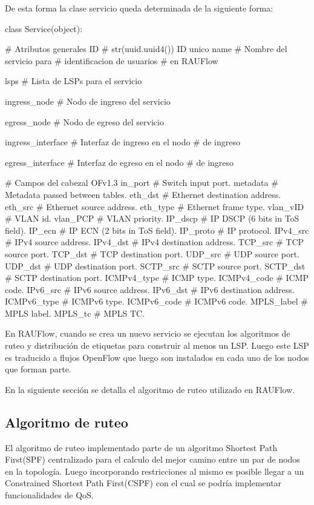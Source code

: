 De esta forma la clase servicio queda determinada de la siguiente forma:\\

\begin{python}
class Service(object):

		# Atributos generales
		ID 				    # str(uuid.uuid4()) ID unico  
		name 				# Nombre del servicio para 
							# identificacion de usuarios 
							# en RAUFlow
							
		lsps				# Lista de LSPs para el servicio
		
		ingress_node		# Nodo de ingreso del servicio
							
		egress_node 		# Nodo de egreso del servicio
							
		ingress_interface 	# Interfaz de ingreso en el nodo 
							# de ingreso
							
		egress_interface 	# Interfaz de egreso en el nodo 
							# de ingreso 
        
		# Campos del cabezal OFv1.3 
		in_port			# Switch input port. 
		metadata 		# Metadata passed between tables. 
		eth_dst 		# Ethernet destination address.
		eth_src 		# Ethernet source address. 
		eth_type 		# Ethernet frame type. 
		vlan_vID 		# VLAN id. 
		vlan_PCP		# VLAN priority. 
		IP_dscp 		# IP DSCP (6 bits in ToS field). 
		IP_ecn  		# IP ECN (2 bits in ToS field). 
		IP_proto		# IP protocol. 
		IPv4_src 		# IPv4 source address. 
		IPv4_dst 		# IPv4 destination address. 
		TCP_src 		# TCP source port. 
		TCP_dst 		# TCP destination port. 
		UDP_src 		# UDP source port. 
		UDP_dst 		# UDP destination port. 
		SCTP_src 		# SCTP source port. 
		SCTP_dst 		# SCTP destination port. 
		ICMPv4_type 	# ICMP type. 
		ICMPv4_code 	# ICMP code. 
		IPv6_src 		# IPv6 source address. 
		IPv6_dst 		# IPv6 destination address. 
		ICMPv6_type 	# ICMPv6 type. 
		ICMPv6_code 	# ICMPv6 code. 
		MPLS_label 		# MPLS label. 
		MPLS_tc 		# MPLS TC. 
		
\end{python}

En RAUFlow, cuando se crea un nuevo servicio se ejecutan los algoritmos de ruteo y distribución de etiquetas para construir al menos un LSP. Luego este LSP es traducido a flujos OpenFlow que luego son instalados en cada uno de los nodos que forman parte. 

En la siguiente secci\'on se detalla el algoritmo de ruteo utilizado en RAUFlow.

\subsection{Algoritmo de ruteo}
El algoritmo de ruteo implementado parte de un algoritmo Shortest Path First(SPF) centralizado para el calculo del mejor camino entre un par de nodos en la topolog\'ia. Luego incorporando restricciones al mismo es posible llegar a un Constrained Shortest Path First(CSPF) con el cual se podr\'ia implementar funcionalidades de QoS.\\

